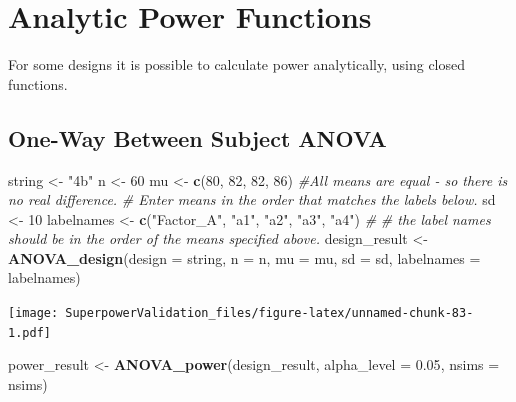 \documentclass[]{book}
\newenvironment{Shaded}{\begin{snugshade}}{\end{snugshade}}
\newcommand{\CommentTok}[1]{\textcolor[rgb]{0.56,0.35,0.01}{\textit{#1}}}
\newcommand{\DataTypeTok}[1]{\textcolor[rgb]{0.13,0.29,0.53}{#1}}
\newcommand{\DecValTok}[1]{\textcolor[rgb]{0.00,0.00,0.81}{#1}}
\newcommand{\FloatTok}[1]{\textcolor[rgb]{0.00,0.00,0.81}{#1}}
\newcommand{\KeywordTok}[1]{\textcolor[rgb]{0.13,0.29,0.53}{\textbf{#1}}}
\newcommand{\NormalTok}[1]{#1}
\newcommand{\StringTok}[1]{\textcolor[rgb]{0.31,0.60,0.02}{#1}}
\begin{document}
\hypertarget{analytic-power-functions}{%
\chapter{Analytic Power Functions}\label{analytic-power-functions}}

For some designs it is possible to calculate power analytically, using closed functions.

\hypertarget{one-way-between-subject-anova}{%
\section{One-Way Between Subject ANOVA}\label{one-way-between-subject-anova}}

\begin{Shaded}
\begin{Highlighting}[]
\NormalTok{string <-}\StringTok{ "4b"}
\NormalTok{n <-}\StringTok{ }\DecValTok{60}
\NormalTok{mu <-}\StringTok{ }\KeywordTok{c}\NormalTok{(}\DecValTok{80}\NormalTok{, }\DecValTok{82}\NormalTok{, }\DecValTok{82}\NormalTok{, }\DecValTok{86}\NormalTok{) }\CommentTok{#All means are equal - so there is no real difference.}
\CommentTok{# Enter means in the order that matches the labels below.}
\NormalTok{sd <-}\StringTok{ }\DecValTok{10}
\NormalTok{labelnames <-}\StringTok{ }\KeywordTok{c}\NormalTok{(}\StringTok{"Factor_A"}\NormalTok{, }\StringTok{"a1"}\NormalTok{, }\StringTok{"a2"}\NormalTok{, }\StringTok{"a3"}\NormalTok{, }\StringTok{"a4"}\NormalTok{) }\CommentTok{#}
\CommentTok{# the label names should be in the order of the means specified above.}
\NormalTok{design_result <-}\StringTok{ }\KeywordTok{ANOVA_design}\NormalTok{(}\DataTypeTok{design =}\NormalTok{ string,}
                   \DataTypeTok{n =}\NormalTok{ n, }
                   \DataTypeTok{mu =}\NormalTok{ mu, }
                   \DataTypeTok{sd =}\NormalTok{ sd, }
                   \DataTypeTok{labelnames =}\NormalTok{ labelnames)}
\end{Highlighting}
\end{Shaded}

\texttt{[image: SuperpowerValidation\_files/figure-latex/unnamed-chunk-83-1.pdf]}

\begin{Shaded}
\begin{Highlighting}[]
\NormalTok{power_result <-}\StringTok{ }\KeywordTok{ANOVA_power}\NormalTok{(design_result, }\DataTypeTok{alpha_level =} \FloatTok{0.05}\NormalTok{, }\DataTypeTok{nsims =}\NormalTok{ nsims)}
\end{Highlighting}
\end{Shaded}
\end{document}
